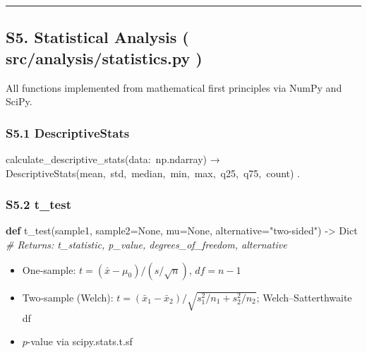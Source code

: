 \documentclass[
]{article}
\newenvironment{Shaded}{}{}
\newcommand{\CommentTok}[1]{\textcolor[rgb]{0.38,0.63,0.69}{\textit{#1}}}
\newcommand{\KeywordTok}[1]{\textcolor[rgb]{0.00,0.44,0.13}{\textbf{#1}}}
\newcommand{\NormalTok}[1]{#1}
\newcommand{\OperatorTok}[1]{\textcolor[rgb]{0.40,0.40,0.40}{#1}}
\newcommand{\StringTok}[1]{\textcolor[rgb]{0.25,0.44,0.63}{#1}}
\newcommand{\VariableTok}[1]{\textcolor[rgb]{0.10,0.09,0.49}{#1}}
\providecommand{\tightlist}{%
  \setlength{\itemsep}{0pt}\setlength{\parskip}{0pt}}
\numberwithin{equation}{section}
\renewcommand{\texttt}[1]{%
    \colorbox{codebg}{\color{codefg}\ttfamily #1}%
}
\begin{document}
\begin{center}\rule{0.5\linewidth}{0.5pt}\end{center}

\subsection{\texorpdfstring{S5. Statistical Analysis
(\texttt{src/analysis/statistics.py})}{S5. Statistical Analysis (src/analysis/statistics.py)}}\label{s5.-statistical-analysis-srcanalysisstatistics.py}

All functions implemented from mathematical first principles via NumPy
and SciPy.

\subsubsection{\texorpdfstring{S5.1
\texttt{DescriptiveStats}}{S5.1 DescriptiveStats}}\label{s5.1-descriptivestats}

\texttt{calculate\_descriptive\_stats(data:\ np.ndarray)} →
\texttt{DescriptiveStats(mean,\ std,\ median,\ min,\ max,\ q25,\ q75,\ count)}.

\subsubsection{\texorpdfstring{S5.2
\texttt{t\_test}}{S5.2 t\_test}}\label{s5.2-t_test}

\begin{Shaded}
\begin{Highlighting}[]
\KeywordTok{def}\NormalTok{ t\_test(sample1, sample2}\OperatorTok{=}\VariableTok{None}\NormalTok{, mu}\OperatorTok{=}\VariableTok{None}\NormalTok{, alternative}\OperatorTok{=}\StringTok{"two{-}sided"}\NormalTok{) }\OperatorTok{{-}\textgreater{}}\NormalTok{ Dict}
\CommentTok{\# Returns: t\_statistic, p\_value, degrees\_of\_freedom, alternative}
\end{Highlighting}
\end{Shaded}

\begin{itemize}
\tightlist
\item
  One-sample: \(t = (\bar{x} - \mu_0) / (s / \sqrt{n})\), \(df = n-1\)
\item
  Two-sample (Welch):
  \(t = (\bar{x}_1 - \bar{x}_2) / \sqrt{s_1^2/n_1 + s_2^2/n_2}\);
  Welch--Satterthwaite df
\item
  \(p\)-value via \texttt{scipy.stats.t.sf}
\end{itemize}
\end{document}
